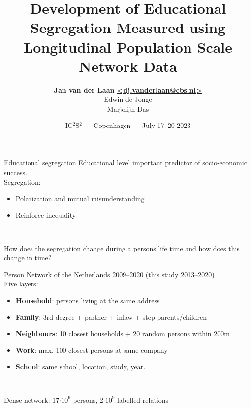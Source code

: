 \documentclass[aspectratio=169]{beamer}
\title{Development of Educational Segregation Measured using Longitudinal Population Scale Network Data}
\author{{\bf Jan van der Laan \url{<dj.vanderlaan@cbs.nl>}}\\ 
Edwin de Jonge\\Marjolijn Das}
\date{IC${}^\mathrm{2}$S${}^\mathrm{2}$ --- Copenhagen --- July 17--20 2023}
\institute{{\tiny IC${}^\mathrm{2}$S${}^\mathrm{2}$ --- Copenhagen --- July 17--20 2023}}
\begin{document}
{
\invert
{}
\begin{frame}
  \titlepage
\end{frame}
\revert
}

{
\invert
\begin{frame}{Educational segregation}
  Educational level important predictor of socio-economic success. \\[1em]

  Segregation:
  \begin{itemize}
    \item Polarization and mutual misunderstanding
    \item Reinforce inequality
  \end{itemize}~


  How does the segregation change during a persons life time and how does this change in time?
\end{frame}
\revert
}

\begin{frame}{Person Network of the Netherlands}
  2009--2020 (this study 2013--2020)\\[2em]

  Five layers:
  \begin{itemize}
    \item \textbf{Household}: persons living at the same address
    \item \textbf{Family}: 3rd degree + partner + inlaw + step parents/children
    \item \textbf{Neighbours}: 10 closest households + 20 random persons within 200m
    \item \textbf{Work}: max. 100 closest persons at same company
    \item \textbf{School}: same school, location, study, year.
  \end{itemize}~

  Dense network: 17$\cdot\mathrm{10}^\mathrm{6}$ persons, 2$\cdot\mathrm{10}^\mathrm{9}$ labelled relations
\end{frame}
\end{document}
